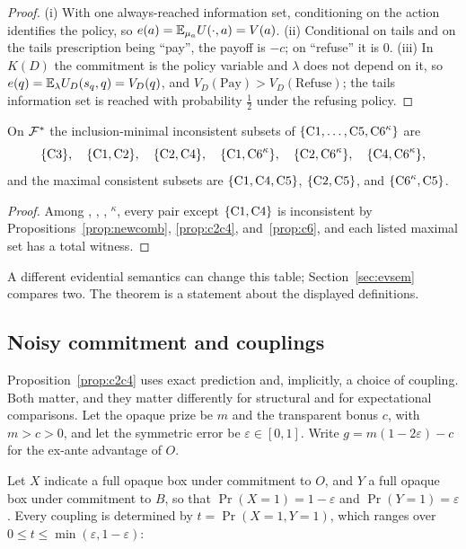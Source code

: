 \begin{proof}
(i) With one always-reached information set, conditioning on the action identifies the policy, so
$e(a)=\mathbb{E}_{\mu_a}U(\cdot,a)=V(a)$. (ii) Conditional on tails and on the tails prescription being
\enquote{pay}, the payoff is $-c$; on \enquote{refuse} it is $0$. (iii) In $K(D)$ the commitment
is the policy variable and $\lambda$ does not depend on it, so $e(q)=\mathbb{E}_\lambda U_D(s_q,q)=V_D(q)$, and
$V_D(\text{Pay})>V_D(\text{Refuse})$; the tails information set is reached with probability
$\tfrac12$ under the refusing policy.
\end{proof}

\begin{theorem}\label{thm:map16}
On $\mathcal{F}^*$ the inclusion-minimal inconsistent subsets of $\{\textup{C1},\dots,\textup{C5},\textup{C6}^\kappa\}$
are
\[
  \{\textup{C3}\},\quad\{\textup{C1},\textup{C2}\},\quad\{\textup{C2},\textup{C4}\},\quad
  \{\textup{C1},\textup{C6}^\kappa\},\quad\{\textup{C2},\textup{C6}^\kappa\},\quad\{\textup{C4},\textup{C6}^\kappa\},
\]
and the maximal consistent subsets are $\{\textup{C1},\textup{C4},\textup{C5}\}$, $\{\textup{C2},\textup{C5}\}$, and
$\{\textup{C6}^\kappa,\textup{C5}\}$.
\end{theorem}

\begin{proof}
Among , , , $^\kappa$, every pair except $\{\textup{C1},\textup{C4}\}$ is
inconsistent by Propositions~\ref{prop:newcomb}, \ref{prop:c2c4}, and~\ref{prop:c6}, and each listed
maximal set has a total witness.
\end{proof}

A different evidential semantics can change this table; Section~\ref{sec:evsem} compares two. The
theorem is a statement about the displayed definitions.

\subsection{Noisy commitment and couplings}\label{sec:couplings}

Proposition~\ref{prop:c2c4} uses exact prediction and, implicitly, a choice of coupling. Both
matter, and they matter differently for structural and for expectational comparisons. Let the
opaque prize be $m$ and the transparent bonus $c$, with $m>c>0$, and let the symmetric error be
$\varepsilon\in[0,1]$. Write $g=m(1-2\varepsilon)-c$ for the ex-ante advantage of $O$.

Let $X$ indicate a full opaque box under commitment to $O$, and $Y$ a full opaque box under commitment
to $B$, so that $\Pr(X=1)=1-\varepsilon$ and $\Pr(Y=1)=\varepsilon$. Every coupling is determined by
$t=\Pr(X=1,Y=1)$, which ranges over $0\le t\le\min(\varepsilon,1-\varepsilon)$:


